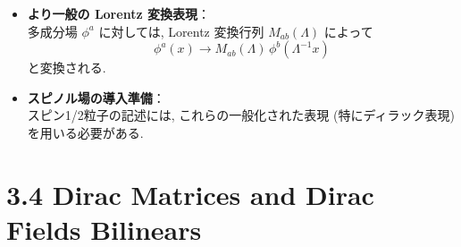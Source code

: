 \documentclass[a4paper,12pt]{article}
\begin{document}
\begin{itemize}
  \item \textbf{より一般の Lorentz 変換表現}：\\
  多成分場 $\phi^a$ に対しては, Lorentz 変換行列 $M_{ab}(\Lambda)$ によって
  \begin{equation*}
    \phi^a(x) \to M_{ab}(\Lambda)\, \phi^b(\Lambda^{-1}x)
  \end{equation*}
  と変換される.

  \item \textbf{スピノル場の導入準備}：\\
  スピン1/2粒子の記述には, これらの一般化された表現 (特にディラック表現) を用いる必要がある.
\end{itemize}
\newpage
\color{black}
\section*{3.4 Dirac Matrices and Dirac Fields Bilinears}
\end{document}
